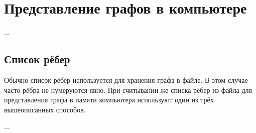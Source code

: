 
\chapter{Представление графов в компьютере}

...

\section{Список рёбер}

Обычно список рёбер используется для хранения графа в файле. В этом случае часто
рёбра не нумеруются явно. При считывании же списка рёбер из файла для 
представления графа в памяти компьютера используют один из трёх вышеописанных 
способов.

...